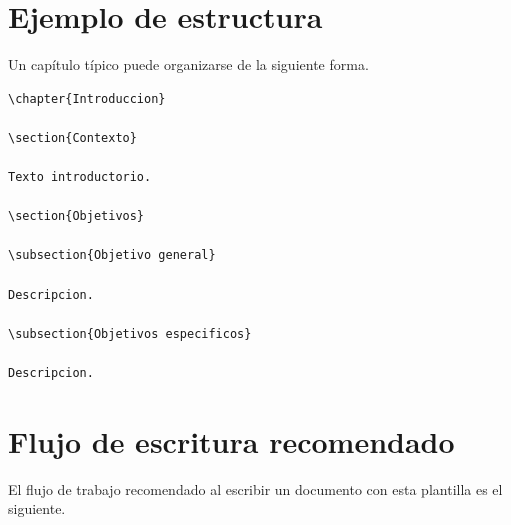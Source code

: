 
\section{Ejemplo de estructura}

Un capítulo típico puede organizarse de la siguiente forma.

\begin{lstlisting}[caption={Estructura típica de un capítulo},label={code:chapterstructure}]
\chapter{Introduccion}

\section{Contexto}

Texto introductorio.

\section{Objetivos}

\subsection{Objetivo general}

Descripcion.

\subsection{Objetivos especificos}

Descripcion.
\end{lstlisting}





\section{Flujo de escritura recomendado}

El flujo de trabajo recomendado al escribir un documento
con esta plantilla es el siguiente.


